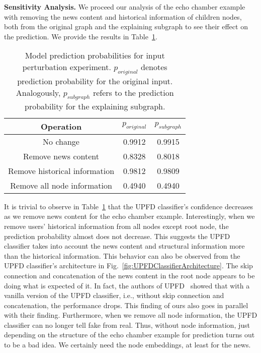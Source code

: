 \textbf{Sensitivity Analysis.} We proceed our analysis of the echo chamber example with removing the news content and historical information of children nodes, both from the original graph and the explaining subgraph to see their effect on the prediction. We provide the results in Table~\ref{tab:echoChamberFeatureRemovalExperimentResults}.\\
\begin{table}
    \centering
    \begin{tabular}{c | c | c}
        \textbf{Operation}            & $p_{original}$ & $p_{subgraph}$ \\
        \hline
        No change                     & 0.9912         & 0.9915         \\
        \hline
        Remove news content           & 0.8328         & 0.8018         \\
        \hline
        Remove historical information & 0.9812         & 0.9809         \\
        \hline
        Remove all node information   & 0.4940         & 0.4940         \\
    \end{tabular}
    \caption[Model prediction probabilities for input perturbation experiment.]{Model prediction probabilities for input perturbation experiment. $p_{original}$ denotes prediction probability for the original input. Analogously, $p_{subgraph}$ refers to the prediction probability for the explaining subgraph.}
    \label{tab:echoChamberFeatureRemovalExperimentResults}
\end{table}
It is trivial to observe in Table~\ref{tab:echoChamberFeatureRemovalExperimentResults} that the UPFD classifier's confidence decreases as we remove news content for the echo chamber example. Interestingly, when we remove users' historical information from all nodes except root node, the prediction probability almost does not decrease. This suggests the UPFD classifier takes into account the news content and structural information more than the historical information. This behavior can also be observed from the UPFD classifier's architecture in Fig.~\ref{fig:UPFDClassifierArchitecture}. The skip connection and concatenation of the news content in the root node appears to be doing what is expected of it. In fact, the authors of UPFD~\parencite{UPFD_Dataset_Shu} showed that with a vanilla version of the UPFD classifier, i.e., without skip connection and concatenation, the performance drops. This finding of ours also goes in parallel with their finding. Furthermore, when we remove all node information, the UPFD classifier can no longer tell fake from real. Thus, without node information, just depending on the structure of the echo chamber example for prediction turns out to be a bad idea. We certainly need the node embeddings, at least for the news.\\
